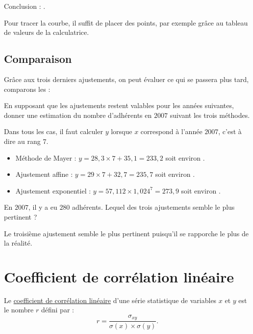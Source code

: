 \documentclass[french]{book}
\begin{document}
Conclusion : .

Pour tracer la courbe, il suffit de placer des points, par exemple grâce au tableau de valeurs de la calculatrice.


\subsection{Comparaison}

Grâce aux trois derniers ajustements, on peut évaluer ce qui se passera plus tard, comparons les :



\begin{exemple}
   En supposant que les ajustements restent valables pour les années suivantes, donner une estimation du nombre d'adhérents en $2007$ suivant les trois méthodes.
\end{exemple}

Dans tous les cas, il faut calculer $y$ lorsque $x$ correspond à l'année $2007$, c'est à dire au rang $7$.

\begin{itemize}
   \item[$\bullet$] Méthode de Mayer : $y=28,3\times7+35,1=233,2$ soit environ .
   \item[$\bullet$] Ajustement affine : $y=29\times 7+32,7=235,7$ soit environ .
   \item[$\bullet$] Ajustement exponentiel : $y=57,112\times1,024^7=273,9$ soit environ .
\end{itemize}



\begin{exemple}
   En $2007$, il y a eu $280$ adhérents. Lequel des trois ajustements semble le plus pertinent ?
\end{exemple}

Le troisième ajustement semble le plus pertinent puisqu'il se rapporche le plus de la réalité.

\section{Coefficient de corrélation linéaire}

\begin{defn}
   Le \underline{coefficient de corrélation linéaire} d'une série statistique de variables $x$ et $y$ est le nombre $r$ défini par :
   $$r=\frac{\sigma_{xy}}{\sigma(x)\times\sigma(y)}.$$
\end{defn}
\end{document}
